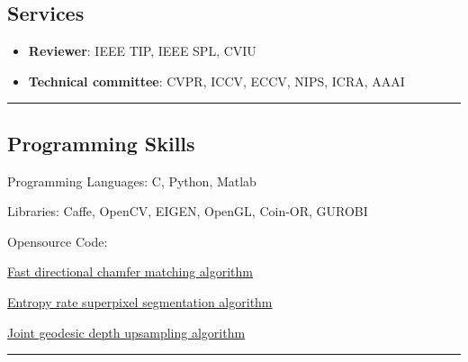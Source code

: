 \documentclass[10pt,letterpaper]{article}
\newenvironment{indentsection}[1]%
{\begin{list}{}%
	{\setlength{\leftmargin}{#1}}%
	\item[]%
}
{\end{list}}
\newcommand{\CPP}
{C\nolinebreak[4]\hspace{-.05em}\raisebox{.22ex}{\footnotesize\bf ++}}
\begin{document}
\subsection*{Services}
\begin{itemize}
\item {\bf Reviewer}: IEEE TIP, IEEE SPL, CVIU\vspace{-2mm}
\item {\bf Technical committee}: CVPR, ICCV, ECCV, NIPS, ICRA, AAAI\vspace{-2mm}
\end{itemize}
\hrule
\vspace{-0.4em}
\subsection*{Programming Skills}
\begin{indentsection}{\parindent}
\begin{description*}
	\item[Programming Languages:]
	\CPP, Python, Matlab
	\item[Libraries:]
    Caffe, OpenCV, EIGEN, OpenGL, Coin-OR, GUROBI
	\item[Opensource Code:] $\quad$
	\begin{itemize*}
    \item \href{https://github.com/mingyuliutw/fdcm.git}{Fast directional chamfer matching algorithm}
    \item \href{https://github.com/mingyuliutw/ers.git}{Entropy rate superpixel segmentation algorithm}
    \item \href{http://www.merl.com/research/license/}{Joint geodesic depth upsampling algorithm}
  \end{itemize*}
\end{description*}
\end{indentsection}
\hrule
\vspace{-0.4em}
\end{document}
